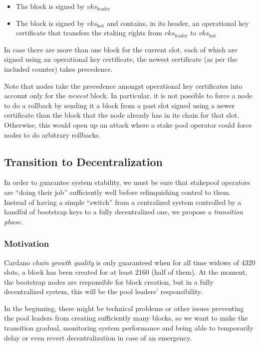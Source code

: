 \documentclass[11pt,a4paper]{article}
\begin{document}
\begin{itemize}
\item
  The block is signed by \(vks_\text{leader}\)
\item
  The block is signed by \(vks_\text{hot}\) and contains, in its header,
  an operational key certificate that transfers the staking rights from
  \(vks_\text{leader}\) to \(vks_\text{hot}\)
\end{itemize}

In case there are more than one block for the current slot, each of
which are signed using an operational key certificate, the newest certificate
(as per the included counter) takes precedence.

Note that nodes take the precedence amongst operational key certificates
into account only for the \emph{newest} block. In particular, it is
not possible to force a node to do a rollback by sending it a block
from a past slot signed using a newer certificate than the block that
the node already has in its chain for that slot. Otherwise, this would
open up an attack where a stake pool operator could force nodes to do
arbitrary rollbacks.

\subsection{Transition to Decentralization}
\label{transition-to-decentralization}

In order to guarantee system stability, we must be sure that stakepool
operators are ``doing their job'' sufficiently well before relinquishing
control to them. Instead of having a simple ``switch'' from a
centralized system controlled by a handful of bootstrap keys to a fully
decentralized one, we propose a \emph{transition phase}.

\subsubsection{Motivation}
\label{motivation}

Cardano \emph{chain growth quality} is only guaranteed when for all time
widows of 4320 slots, a block has been created for at least 2160 (half
of them). At the moment, the bootstrap nodes are responsible for block
creation, but in a fully decentralized system, this will be the pool
leaders' responsibility.

In the beginning, there might be technical problems or other issues
preventing the pool leaders from creating sufficiently many blocks, so
we want to make the transition gradual, monitoring system performance
and being able to temporarily delay or even revert decentralization in
case of an emergency.
\end{document}
